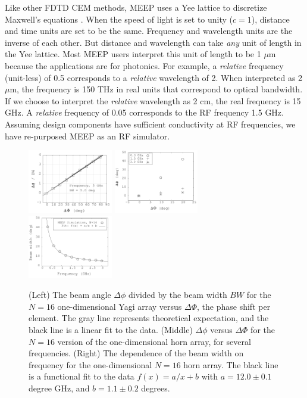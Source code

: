 \documentclass[../../main.tex]{subfiles}
\begin{document}
Like other FDTD CEM methods, MEEP uses a Yee lattice to discretize Maxwell's equations \cite{10.1109/tap.1966.1138693}.  When the speed of light is set to unity ($c = 1$), distance and time units are set to be the same.  Frequency and wavelength units are the inverse of each other.  But distance and wavelength can take \textit{any} unit of length in the Yee lattice.  Most MEEP users interpret this unit of length to be 1 $\mu$m because the applications are for photonics.  For example, a \textit{relative} frequency (unit-less) of 0.5 corresponds to a \textit{relative} wavelength of 2.  When interpreted as 2 $\mu$m, the frequency is 150 THz in real units that correspond to optical bandwidth.  If we choose to interpret the \textit{relative} wavelength as 2 cm, the real frequency is 15 GHz.  A \textit{relative} frequency of 0.05 corresponds to the RF frequency 1.5 GHz.  Assuming design components have sufficient conductivity at RF frequencies, we have re-purposed MEEP as an RF simulator.  \\ \vspace{2.5mm}

\begin{figure}
\centering
\includegraphics[width=0.33\textwidth]{figures/Oct30_plot1.png}
\includegraphics[width=0.33\textwidth]{figures/Aug11_plot2.png}
\includegraphics[width=0.33\textwidth]{figures/Aug11_plot1.png}
\caption{\label{fig:pa_1} (Left) The beam angle $\Delta \phi$ divided by the beam width $BW$ for the $N = 16$ one-dimensional Yagi array versus $\Delta \Phi$, the phase shift per element. The gray line represents theoretical expectation, and the black line is a linear fit to the data.  (Middle) $\Delta \phi$ versus $\Delta \Phi$ for the $N=16$ version of the one-dimensional horn array, for several frequencies.  (Right) The dependence of the beam width on frequency for the one-dimensional $N=16$ horn array.  The black line is a functional fit to the data $f(x) = a/x + b$ with $a=12.0\pm 0.1$ degree GHz, and $b=1.1\pm 0.2$ degrees.}
\end{figure}
\end{document}
